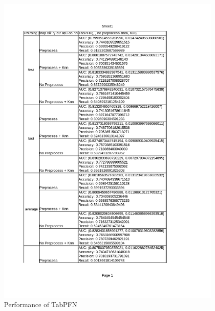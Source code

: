 \documentclass[../main.tex]{subfiles}
\begin{document}
 \begin{figure}[H]
    \centering
    \includegraphics[width=\textwidth]{Figure/KidneyResultLimit-new_TabPFN.png}
    \caption{Performance of TabPFN}
    \label{fig:KidneyResultLimit-new_TabPFN}
\end{figure}
\end{document}
